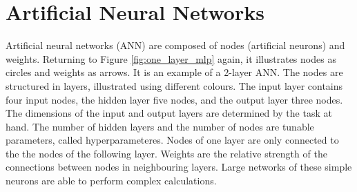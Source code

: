 \section{Artificial Neural Networks} \label{sec:artificial neural networks}
Artificial neural networks (ANN) are composed of nodes (artificial neurons) and weights. Returning to Figure \ref{fig:one_layer_mlp} again, it illustrates nodes as circles and weights as arrows. It is an example of a 2-layer ANN. The nodes are structured in layers, illustrated using different colours. The input layer contains four input nodes, the hidden layer five nodes, and the output layer three nodes. The dimensions of the input and output layers are determined by the task at hand. The number of hidden layers and the number of nodes are tunable parameters, called hyperparameteres. Nodes of one layer are only connected to the the nodes of the following layer. Weights are the relative strength of the connections between nodes in neighbouring layers. Large networks of these simple neurons are able to perform complex calculations.


